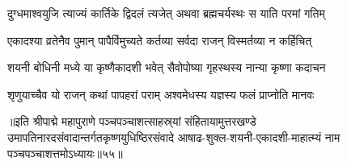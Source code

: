 \twolineshloka
{दुग्धमाश्वयुजि त्याज्यं कार्तिके द्विदलं त्यजेत्}
{अथवा ब्रह्मचर्यस्थः स याति परमां गतिम्}%

\twolineshloka
{एकादश्या व्रतेनैव पुमान् पापैर्विमुच्यते}
{कर्तव्या सर्वदा राजन् विस्मर्तव्या न कर्हिचित्}%

\twolineshloka
{शयनी बोधिनी मध्ये या कृष्णैकादशी भवेत्}
{सैवोपोष्या गृहस्थस्य नान्या कृष्णा कदाचन}%

\twolineshloka
{शृणुयाच्चैव यो राजन् कथां पापहरां पराम्}
{अश्वमेधस्य यज्ञस्य फलं प्राप्नोति मानवः}%

॥इति श्रीपाद्मे महापुराणे पञ्चपञ्चाशत्साहस्र्यां संहितायामुत्तरखण्डे उमापतिनारदसंवादान्तर्गतकृष्णयुधिष्ठिरसंवादे आषाढ-शुक्ल-शयनी-एकादशी-माहात्म्यं नाम पञ्चपञ्चाशत्तमोऽध्यायः॥५५॥

\genMangalaShloka

\hyperref[sec:ekadashi_mahatmyam_padma_puranam]{\closesub}
\clearpage

